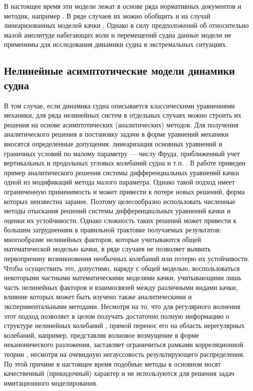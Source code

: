 В настоящее время эти модели лежат в основе ряда нормативных документов и методик, например \citep{dk14}\citep{dk15}. В ряде случаев их можно обобщить и на случай линеаризованных моделей качки \citep{dk1}. Однако в силу предположений об относительно малой амплитуде набегающих волн и перемещений судна данные модели не применимы для исследования динамики судна в экстремальных ситуациях.


\subsection{Нелинейные асимптотические модели \mbox{динамики} судна}

В том случае, если динамика судна описывается классическими уравнениями механики, для ряда нелинейных систем в отдельных случаях можно строить их решения на основе асимптотических (аналитических) методов. Для получения аналитического решения в постановку задачи в форме уравнений механики вносятся определенные допущения: линеаризация основных уравнений и граничных условий по малому параметру --– числу Фруда, приближенный учет вертикальных и продольных угловых колебаний судна и т.п. \citep{dk16}. В работе \citep{dk17} приведен пример аналитического решения системы дифференциальных уравнений качки одной из модификаций метода малого параметра. Однако такой подход имеет ограниченную применимость и может привести к потере новых решений, форма которых неизвестна заранее. Поэтому целесообразно использовать численные методы отыскания решений системы дифференциальных уравнений качки и оценки их устойчивости. Однако сложность таких решений может привести к большим затруднениям в правильной трактовке получаемых результатов: многообразие нелинейных факторов, которые учитываются общей математической моделью качки, в ряде случаев не позволяет выявить первопричину возникновения необычных колебаний или потерю их устойчивости. Чтобы осуществить это, допустимо, наряду с общей моделью, воспользоваться некоторыми частными математическими моделями качки, учитывающими лишь часть нелинейных факторов и взаимосвязей между различными видами качки, влияние которых может быть изучено также аналитическими и экспериментальными методами. Несмотря на то, что для регулярного волнения этот подход позволяет в целом получать достаточно полную информацию о структуре нелинейных колебаний \citep{dk17}, прямой перенос его на область нерегулярных колебаний, например, представляя волновое возмущение в форме неканонического разложения, заставляет ограничиться рамками корреляционной теории \citep{dk18}, несмотря на очевидную негауссовость результирующего распределения. По этой причине в настоящее время подобные методы в основном носят качественный (прикидочный) характер и не используются для решения задач имитационного моделирования.

